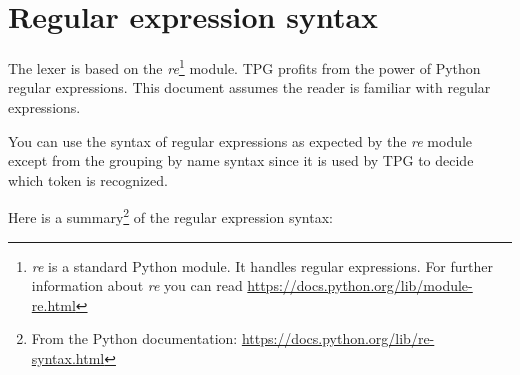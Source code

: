 \section{Regular expression syntax}

The lexer is based on the \emph{re}\footnote{\emph{re} is a standard Python module. It handles regular expressions. For further information about \emph{re} you can read \url{https://docs.python.org/lib/module-re.html}} module.
TPG profits from the power of Python regular expressions.
This document assumes the reader is familiar with regular expressions.

You can use the syntax of regular expressions as expected by the \emph{re} module except from the grouping by name syntax since it is used by TPG to decide which token is recognized.

Here is a summary\footnote{From the Python documentation: \url{https://docs.python.org/lib/re-syntax.html}} of the regular expression syntax:

